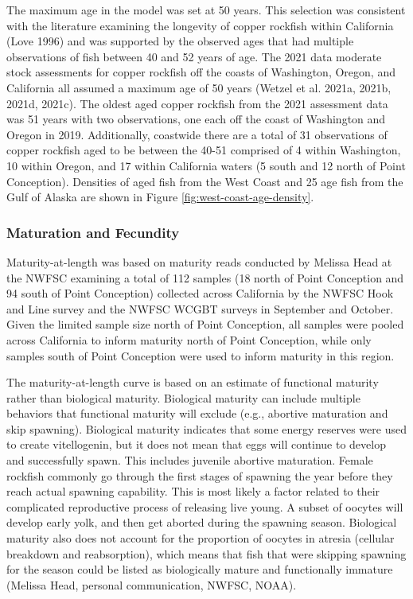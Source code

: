 \documentclass[11pt,
  english,
  letterpaper,
]{article}
\begin{document}
The maximum age in the model was set at 50 years. This selection was consistent with the literature examining the longevity of copper rockfish within California (Love 1996) and was supported by the observed ages that had multiple observations of fish between 40 and 52 years of age. The 2021 data moderate stock assessments for copper rockfish off the coasts of Washington, Oregon, and California all assumed a maximum age of 50 years (Wetzel et al. 2021a, 2021b, 2021d, 2021c). The oldest aged copper rockfish from the 2021 assessment data was 51 years with two observations, one each off the coast of Washington and Oregon in 2019. Additionally, coastwide there are a total of 31 observations of copper rockfish aged to be between the 40-51 comprised of 4 within Washington, 10 within Oregon, and 17 within California waters (5 south and 12 north of Point Conception). Densities of aged fish from the West Coast and 25 age fish from the Gulf of Alaska are shown in Figure \ref{fig:west-coast-age-density}.

\hypertarget{maturation-and-fecundity}{%
\subsubsection{Maturation and Fecundity}\label{maturation-and-fecundity}}

Maturity-at-length was based on maturity reads conducted by Melissa Head at the NWFSC examining a total of 112 samples (18 north of Point Conception and 94 south of Point Conception) collected across California by the NWFSC Hook and Line survey and the NWFSC WCGBT surveys in September and October. Given the limited sample size north of Point Conception, all samples were pooled across California to inform maturity north of Point Conception, while only samples south of Point Conception were used to inform maturity in this region.

The maturity-at-length curve is based on an estimate of functional maturity rather than biological maturity. Biological maturity can include multiple behaviors that functional maturity will exclude (e.g., abortive maturation and skip spawning). Biological maturity indicates that some energy reserves were used to create vitellogenin, but it does not mean that eggs will continue to develop and successfully spawn. This includes juvenile abortive maturation. Female rockfish commonly go through the first stages of spawning the year before they reach actual spawning capability. This is most likely a factor related to their complicated reproductive process of releasing live young. A subset of oocytes will develop early yolk, and then get aborted during the spawning season. Biological maturity also does not account for the proportion of oocytes in atresia (cellular breakdown and reabsorption), which means that fish that were skipping spawning for the season could be listed as biologically mature and functionally immature (Melissa Head, personal communication, NWFSC, NOAA).
\end{document}
